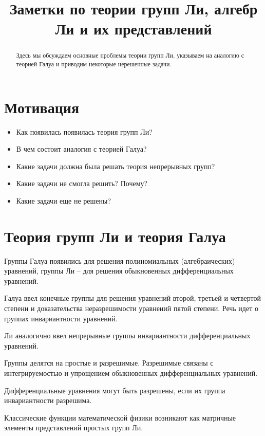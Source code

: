 \documentclass[12pt]{article}
\begin{document}
\title{Заметки по теории групп Ли, алгебр Ли и их представлений}

\maketitle

\begin{abstract}
  Здесь мы обсуждаем основные проблемы теории групп Ли, указываем на
  аналогию с теорией Галуа и приводим некоторые нерешенные задачи.
\end{abstract}

\section{Мотивация}
\begin{itemize}
\item Как появилась появилась теория групп Ли?
\item В чем состоит аналогия с теорией Галуа?
\item Какие задачи должна была решать теория непрерывных групп?
\item Какие задачи не смогла решить? Почему?
\item Какие задачи еще не решены?
\end{itemize}

\section{Теория групп Ли и теория Галуа}
\label{sec:galois}

Группы Галуа появились для решения полиномиальных (алгебраических)
уравнений, группы Ли -- для решения обыкновенных дифференциальных
уравнений. 

Галуа ввел конечные группы для решения уравнений второй, третьей и
четвертой степени и доказательства неразрешимости уравнений пятой
степени. Речь идет о группах инвариантности уравнений.




Ли аналогично ввел непрерывные группы инвариантности дифференциальных
уравнений.

Группы делятся на простые и разрешимые. Разрешимые связаны с
интегрируемостью  и упрощением обыкновенных дифференциальных уравнений. 

Дифференциальные уравнения могут быть разрешены, если их группа
инвариантности разрешима. 

Классические функции математической физики возникают как матричные
элементы представлений простых групп Ли. 


\printindex

{}

\end{document}
